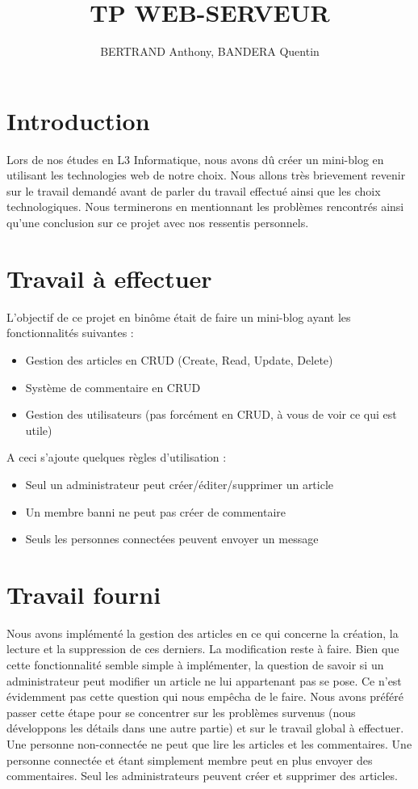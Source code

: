\documentclass{article}
\title{TP WEB-SERVEUR}
\date{}
\author{BERTRAND Anthony, BANDERA Quentin}
\begin{document}
    \maketitle
    \tableofcontents
    \newpage
    \section{Introduction}
    Lors de nos études en L3 Informatique, nous avons dû créer un mini-blog en utilisant les technologies web de notre choix.
    Nous allons très brievement revenir sur le travail demandé avant de parler du travail effectué ainsi que les choix technologiques.
    Nous terminerons en mentionnant les problèmes rencontrés ainsi qu'une conclusion sur ce projet avec nos ressentis personnels.

    \section{Travail à effectuer}
    L'objectif de ce projet en binôme était de faire un mini-blog ayant les fonctionnalités suivantes :\\
    \begin{itemize}
        \item Gestion des articles en CRUD (Create, Read, Update, Delete)
        \item Système de commentaire en CRUD
        \item Gestion des utilisateurs (pas forcément en CRUD, à vous de voir ce qui est utile)
    \end{itemize} 

    A ceci s'ajoute quelques règles d'utilisation :\\
    \begin{itemize}
        \item Seul un administrateur peut créer/éditer/supprimer un article
        \item Un membre banni ne peut pas créer de commentaire
        \item Seuls les personnes connectées peuvent envoyer un message
    \end{itemize} 

    \section{Travail fourni}
    Nous avons implémenté la gestion des articles en ce qui concerne la création, la lecture et la suppression de ces derniers. La modification
    reste à faire. Bien que cette fonctionnalité semble simple à implémenter, la question de savoir si un administrateur peut modifier un article
    ne lui appartenant pas se pose. Ce n'est évidemment pas cette question qui nous empêcha de le faire. Nous avons préféré passer cette étape
    pour se concentrer sur les problèmes survenus (nous développons les détails dans une autre partie) et sur le travail global à effectuer.\\
    Une personne non-connectée ne peut que lire les articles et les commentaires. Une personne connectée et étant simplement membre peut en plus
    envoyer des commentaires. Seul les administrateurs peuvent créer et supprimer des articles.
\end{document}
